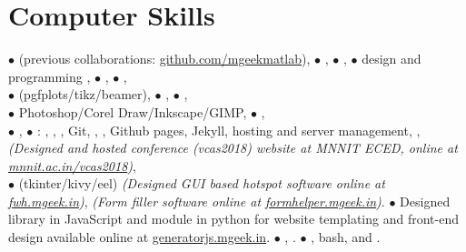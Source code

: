 \vspace{-2.5em}
\section{Computer Skills}
{\scriptsize$\bullet$}  (previous collaborations: \href{https://github.com/mgeekmatlab}{github.com/mgeekmatlab}), {\scriptsize$\bullet$} , {\scriptsize$\bullet$} , {\scriptsize$\bullet$}  design and programming , {\scriptsize$\bullet$} , {\scriptsize$\bullet$} ,\\ 
{\scriptsize$\bullet$}  (pgfplots/tikz/beamer), {\scriptsize$\bullet$} , {\scriptsize$\bullet$} ,\\
{\scriptsize$\bullet$} Photoshop/Corel Draw/Inkscape/GIMP, {\scriptsize$\bullet$} , \\
{\scriptsize$\bullet$} , {\scriptsize$\bullet$} : , , , Git, , , Github pages, Jekyll, hosting and server management, ,  \emph{(Designed and hosted conference (vcas2018) website at MNNIT ECED, online at \href{http://mnnit.ac.in/vcas2018}{mnnit.ac.in/vcas2018})}, \\
{\scriptsize$\bullet$}  (tkinter/kivy/eel) \emph{(Designed GUI based hotspot software online at \href{https://fwh.mgeek.in}{fwh.mgeek.in})}, \emph{(Form filler software online at \href{https://formhelper.mgeek.in}{formhelper.mgeek.in})}. {\scriptsize$\bullet$} Designed  library in JavaScript and  module in python for website templating and front-end design available online at \href{https://generatorjs.mgeek.in}{generatorjs.mgeek.in}. {\scriptsize$\bullet$} , . {\scriptsize$\bullet$} , bash,  and .\\
\vspace{-1em}
\sectionline
